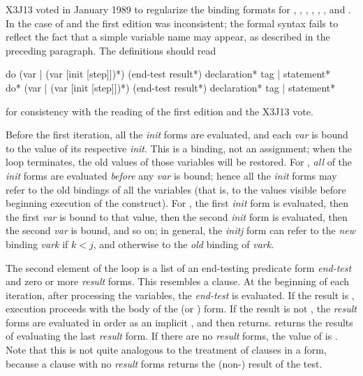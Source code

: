 \begin{defmac}
\begin{new}
X3J13 voted in January 1989
to regularize the binding formats for , , ,
, , , and .
In the case of  and  the first edition was inconsistent;
the formal syntax fails to reflect the fact that a simple variable
name may appear, as described in the preceding paragraph.  The
definitions should read

\begin{defmac}
do ({var | (var [init [step]])}*)
   (end-test {result}*)
   {declaration}* {tag | statement}* \\
do* ({var | (var [init [step]])}*)
    (end-test {result}*)
    {declaration}* {tag | statement}*

for consistency with the reading of the first edition and the X3J13 vote.
\end{defmac}
\end{new}

Before the first iteration, all the \emph{init} forms are evaluated, and
each \emph{var} is bound to the value of its respective \emph{init}.
This is a binding, not an assignment; when the loop terminates,
the old values of those variables will be restored.
For , \emph{all} of the \emph{init} forms are evaluated \emph{before} any \emph{var}
is bound; hence all the
\emph{init} forms may refer to the old bindings of all the variables
(that is, to the values visible before beginning execution of
the  construct).
For , the first \emph{init} form is evaluated, then the first
\emph{var} is bound to that value, then the second \emph{init} form
is evaluated, then the second \emph{var} is bound, and so on;
in general, the \emph{initj} form can refer to the \emph{new} binding \emph{vark}
if $k<j$, and otherwise to the \emph{old} binding of
\emph{vark}.

The second element of the loop is a list of an end-testing
predicate form \emph{end-test} and zero or more \emph{result} forms.
This resembles a  clause.
At the beginning of each iteration, after processing the variables,
the \emph{end-test} is evaluated.  If the result is
{\false}, execution proceeds with the body of the  (or ) form.
If the
result is not {\false}, the \emph{result} forms are evaluated in order
as an implicit ,
and then  returns.   returns the results of evaluating
the last \emph{result} form.
If there are no \emph{result} forms, the value of  is {\false}.
Note that this is not quite analogous to the treatment of
clauses in a  form, because a  clause
with no \emph{result} forms returns the (non-{\nil}) result of the test.


\end{defmac}
